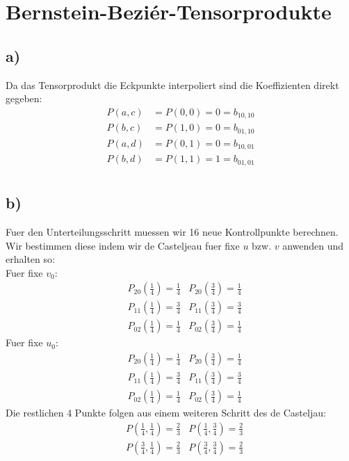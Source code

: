 
\section*{Bernstein-Bezi\'er-Tensorprodukte}
\subsection*{a)} 


Da das Tensorprodukt die Eckpunkte interpoliert sind die Koeffizienten direkt gegeben:
\begin{align}
	P(a,c) &= P(0,0) = 0 = b_{10,10} \\
	P(b,c) &= P(1,0) = 0 = b_{01,10} \\
	P(a,d) &= P(0,1) = 0 = b_{10,01} \\
	P(b,d) &= P(1,1) = 1 = b_{01,01} \\
\end{align}


\subsection*{b)}
Fuer den Unterteilungsschritt muessen wir 16 neue Kontrollpunkte berechnen. Wir bestimmen diese indem wir de Casteljeau fuer fixe $u$ bzw. $v$ anwenden und erhalten so:\\
Fuer fixe $v_0$:
\begin{align}
	&P_{20}(\frac{1}{4}) = \frac{1}{4} 
	&P_{20}(\frac{3}{4}) = \frac{1}{4} \\
	&P_{11}(\frac{1}{4}) = \frac{3}{4} 
	&P_{11}(\frac{3}{4}) = \frac{3}{4} \\
	&P_{02}(\frac{1}{4}) = \frac{1}{4} 	
	&P_{02}(\frac{3}{4}) = \frac{1}{4} 
\end{align}
Fuer fixe $u_0$:
\begin{align}
	&P_{20}(\frac{1}{4}) = \frac{1}{4} 
	&P_{20}(\frac{3}{4}) = \frac{1}{4} \\
	&P_{11}(\frac{1}{4}) = \frac{3}{4} 
	&P_{11}(\frac{3}{4}) = \frac{3}{4} \\
	&P_{02}(\frac{1}{4}) = \frac{1}{4} 	
	&P_{02}(\frac{3}{4}) = \frac{1}{4} 
\end{align}
Die restlichen 4 Punkte folgen aus einem weiteren Schritt des de Casteljau:
\begin{align}
	&P(\frac{1}{4},\frac{1}{4}) = \frac{2}{3} 
	&P(\frac{1}{4},\frac{3}{4}) = \frac{2}{3} \\
	&P(\frac{3}{4},\frac{1}{4}) = \frac{2}{3} 
	&P(\frac{3}{4},\frac{3}{4}) = \frac{2}{3} 
\end{align}

